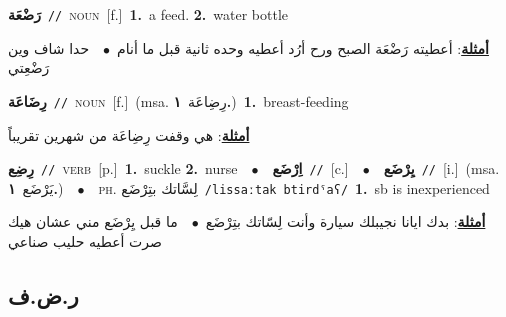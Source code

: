 \documentclass[10pt,a4paper,twoside]{article} %
\begin{document}
\begin{multicols}{2}
{\setlength\topsep{0pt}\textbf{\foreignlanguage{arabic}{رَضْعَة}}\ {\color{gray}\texttt{//}\color{black}}\ \textsc{noun}\ [f.]\ \textbf{1.}~a feed.  \textbf{2.}~water bottle\  \begin{flushright}\color{gray}\foreignlanguage{arabic}{\textbf{\underline{\foreignlanguage{arabic}{أمثلة}}}: أعطيته رَضْعَة الصبح ورح أرُد أعطيه وحده ثانية قبل ما أنام\ $\bullet$\ \  حدا شاف وين رَضْعِتي}\end{flushright}\color{black}} \vspace{2mm}

{\setlength\topsep{0pt}\textbf{\foreignlanguage{arabic}{رِضَاعَة}}\ {\color{gray}\texttt{//}\color{black}}\ \textsc{noun}\ [f.]\ \color{gray}(msa. \foreignlanguage{arabic}{رِضِاعَة}~\foreignlanguage{arabic}{\textbf{١.}})\color{black}\ \textbf{1.}~breast-feeding\  \begin{flushright}\color{gray}\foreignlanguage{arabic}{\textbf{\underline{\foreignlanguage{arabic}{أمثلة}}}: هي وقفت رِضِاعَة من شهرين تقريباً}\end{flushright}\color{black}} \vspace{2mm}

{\setlength\topsep{0pt}\textbf{\foreignlanguage{arabic}{رِضِع}}\ {\color{gray}\texttt{//}\color{black}}\ \textsc{verb}\ [p.]\ \textbf{1.}~suckle  \textbf{2.}~nurse\ \ $\bullet$\ \ \setlength\topsep{0pt}\textbf{\foreignlanguage{arabic}{اِرْضَع}}\ {\color{gray}\texttt{//}\color{black}}\ [c.]\ \ $\bullet$\ \ \setlength\topsep{0pt}\textbf{\foreignlanguage{arabic}{يِرْضَع}}\ {\color{gray}\texttt{//}\color{black}}\ [i.]\ \color{gray}(msa. \foreignlanguage{arabic}{يَرْضَع}~\foreignlanguage{arabic}{\textbf{١.}})\color{black}\ \ $\bullet$\ \ \textsc{ph.} \color{gray} \foreignlanguage{arabic}{لِسَّاتك بتِرْضَع}\color{black}\ {\color{gray}\texttt{/{\sffamily lissaːtak btirdˤaʕ}/}\color{black}}\ \textbf{1.}~sb is inexperienced\  \begin{flushright}\color{gray}\foreignlanguage{arabic}{\textbf{\underline{\foreignlanguage{arabic}{أمثلة}}}: بدك ايانا نجيبلك سيارة وأنت لِسّاتك بتِرْضَع\ $\bullet$\ \  ما قبل يِرْضَع مني عشان هيك صرت أعطيه حليب صناعي}\end{flushright}\color{black}} \vspace{2mm}

\vspace{-3mm}
\subsection*{\color{blue}\foreignlanguage{arabic}{ر.ض.ف}\color{blue}{}} 


\end{multicols}
\end{document}
